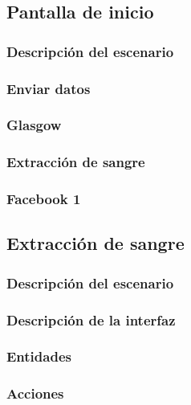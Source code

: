 \subsection{Pantalla de inicio}
    \subsubsection{Descripción del escenario}
    \subsubsection{Enviar datos}
    \subsubsection{Glasgow}
    \subsubsection{Extracción de sangre}
    \subsubsection{Facebook 1}

\subsection{Extracción de sangre}
    \subsubsection{Descripción del escenario}
    \subsubsection{Descripción de la interfaz}
    \subsubsection{Entidades} %
    \subsubsection{Acciones} %
